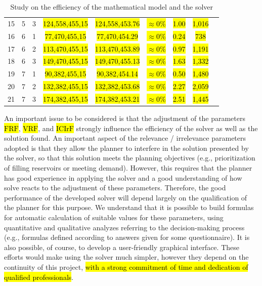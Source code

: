 \documentclass{singlecol}
\theoremstyle{TH}{
\newtheorem{lemma}{Lemma}
\newtheorem{theorem}[lemma]{Theorem}
\newtheorem{corrolary}[lemma]{Corrolary}
\newtheorem{conjecture}[lemma]{Conjecture}
\newtheorem{proposition}[lemma]{Proposition}
\newtheorem{claim}[lemma]{Claim}
\newtheorem{stheorem}[lemma]{Wrong Theorem}
\newtheorem{algorithm}{Algorithm}
}
\theoremstyle{THrm}{
\newtheorem{definition}{Definition}[section]
\newtheorem{question}{Question}[section]
\newtheorem{remark}{Remark}
\newtheorem{scheme}{Scheme}
}
\theoremstyle{THhit}{
\newtheorem{case}{Case}[section]
}
\begin{document}
\begin{table}[t]
\begin{center}
\begin{small}
\begin{tabular}{ c c c c c c c c c }
	 15  &  5 & 3  & \hl{124,558,455,15} & \hl{124,558,453.76} & \hl{$\approx 0\%$} &  \hl{1.00}   &   \hl{1,016}       \\
	 16  &  6 & 1  & \hl{77,470,455,15} & \hl{77,470,454.29}  & \hl{$\approx 0\%$}  &  \hl{0.24}   &   \hl{738}       \\
	 17  &  6 & 2  & \hl{113,470,455,15} & \hl{113,470,453.89}  & \hl{$\approx 0\%$} &  \hl{0.97}   &   \hl{1,191}      \\
	 18  &  6 & 3  & \hl{149,470,455,15} & \hl{149,470,455.13}  & \hl{$\approx 0\%$} & \hl{1.63}   &   \hl{1,332}     \\
	 19  &  7 & 1  & \hl{90,382,455,15}  & \hl{90,382,454.14}  & \hl{$\approx 0\%$} &  \hl{0.50}   &  \hl{1,480}       \\
	 20  &  7 & 2  & \hl{132,382,455,15} & \hl{132,382,453.68}  & \hl{$\approx 0\%$}  &  \hl{2.27}   &  \hl{2,059}      \\
	 21  &  7 & 3  & \hl{174,382,455,15} & \hl{174,382,453.21}  & \hl{$\approx 0\%$}  &  \hl{2.51}   &  \hl{1,445}      \\
	
	\end{tabular}
\caption{Study on the efficiency of the mathematical model and the solver}
\label{tab:lingoEvaluation}
\end{small}
\end{center}
\end{table}

An important issue to be considered is that the adjustment of the parameters \hl{$\mathrm{FRF}$}, \hl{$\mathrm{VRF}$}, and \hl{$\mathrm{ICIrF}$} strongly influence the efficiency of the solver as well as the solution found. An important aspect of the relevance / irrelevance parameters adopted is that they allow the planner to interfere in the solution presented by the solver, so that this solution meets the planning objectives (e.g., prioritization of filling reservoirs or meeting demand). However, this requires that the planner has good experience in applying the solver and a good understanding of how solve reacts to the adjustment of these parameters. Therefore, the good performance of the developed solver will depend largely on the qualification of the planner for this purpose. We understand that it is possible to build formulas for automatic calculation of suitable values for these parameters, using quantitative and qualitative analyzes referring to the decision-making process (e.g., formulas defined according to answers given for some questionnaire). It is also possible, of course, to develop a user-friendly graphical interface. These efforts would make using the solver much simpler, however they depend on the continuity of this project, \hl{with a strong commitment of time and dedication of qualified professionals}.
\end{document}
